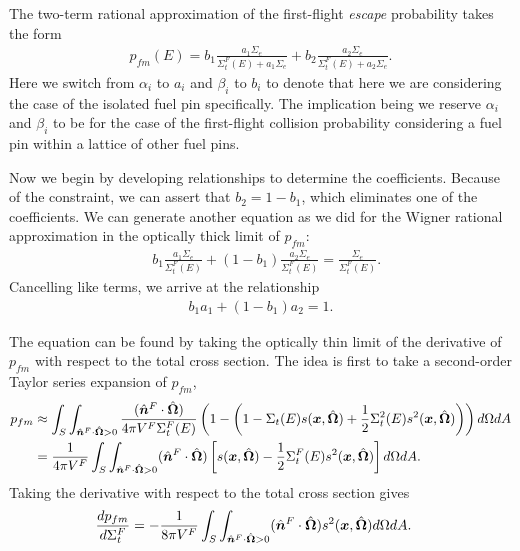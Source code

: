 The two-term rational approximation of the first-flight \emph{escape} probability takes the form
\begin{align}
  p_{fm}(E) = b_1 \frac{ a_1 \Sigma_e }{ \Sigma_t^F(E) + a_1 \Sigma_e } + b_2 \frac{ a_2 \Sigma_e }{ \Sigma_t^F(E) + a_2 \Sigma_e } .
\end{align}
Here we switch from $\alpha_i$ to $a_i$ and $\beta_i$ to $b_i$ to denote that here we are considering the case of the isolated fuel pin specifically. The implication being we reserve $\alpha_i$ and $\beta_i$ to be for the case of the first-flight collision probability considering a fuel pin within a lattice of other fuel pins.  

Now we begin by developing relationships to determine the coefficients. Because of the constraint, we can assert that $b_2 = 1 - b_1$, which eliminates one of the coefficients. We can generate another equation as we did for the Wigner rational approximation in the optically thick limit of $p_{fm}$:
\begin{align}
    &b_1 \frac{ a_1 \Sigma_e }{ \Sigma_t^F(E)  } + ( 1 - b_1 ) \frac{ a_2 \Sigma_e }{ \Sigma_t^F(E) } = \frac{\Sigma_e}{\Sigma_t^F(E)} . \nonumber
\end{align}
Cancelling like terms, we arrive at the relationship
\begin{align}
   b_1 a_1 + ( 1 - b_1 ) a_2 = 1 .
\end{align}

The equation can be found by taking the optically thin limit of the derivative of $p_{fm}$ with respect to the total cross section. The idea is first to take a second-order Taylor series expansion of $p_{fm}$,
\begin{align}
  p_{fm} 
  &\approx \int_{S} \int_{\hat{\bm{n}}^F \cdot \hat{\mathbf{\Omega}} > 0} \frac{( \hat{\bm{n}}^F \cdot \hat{\mathbf{\Omega}} )}{4\pi V^F \Sigma_t^F(E)} \left( 1 - \left( 1 - \Sigma_t(E) s(\bm{x},\hat{\mathbf{\Omega}}) + \frac{1}{2} \Sigma_t^2(E) s^2(\bm{x},\hat{\mathbf{\Omega}}) \right) \right) d\Omega dA \nonumber \\
  &= \frac{1}{ 4\pi V^F } \int_{S} \int_{\hat{\bm{n}}^F \cdot \hat{\mathbf{\Omega}} > 0}  ( \hat{\bm{n}}^F \cdot \hat{\mathbf{\Omega}} ) \left[  s(\bm{x},\hat{\mathbf{\Omega}}) - \frac{1}{2} \Sigma_t^F(E) s^2(\bm{x},\hat{\mathbf{\Omega}}) \right]  d\Omega dA . 
\end{align}
Taking the derivative with respect to the total cross section gives
\begin{align}
  \frac{d p_{fm} }{d\Sigma_t^F} 
  &= - \frac{1}{ 8\pi V^F } \int_{S} \int_{\hat{\bm{n}}^F \cdot \hat{\mathbf{\Omega}} > 0}  ( \hat{\bm{n}}^F \cdot \hat{\mathbf{\Omega}} ) s^2(\bm{x},\hat{\mathbf{\Omega}})   d\Omega dA . 
\end{align}

